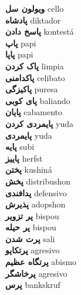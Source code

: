 \textbf{ ویولون سل  } cello \\
\textbf{ پادشاه  } diktador \\
\textbf{ پاسخ دادن  } kontestá \\
\textbf{ پاپ  } papi \\
\textbf{ پاپا  } papi \\
\textbf{ پاک کردن  } limpia \\
\textbf{ پاکدامنی  } celibato \\
\textbf{ پاکیزگی  } puresa \\
\textbf{ پای کوبی  } baliando \\
\textbf{ پایان  } cabamento \\
\textbf{ پایمردی کردن  } yuda \\
\textbf{ پایمردی  } yuda \\
\textbf{ پایه  } subi \\
\textbf{ پاییز  } herfst \\
\textbf{ پختن  } kushiná \\
\textbf{ پخش  } distribushon \\
\textbf{ پدافندی  } defensivo \\
\textbf{ پذیرش  } adopshon \\
\textbf{ پر تزویر  } bispou \\
\textbf{ پر حیله  } bispou \\
\textbf{ پرت شدن  } sali \\
\textbf{ پرتکاپو  } agresivo \\
\textbf{ پرتگاه عظیم  } abismo \\
\textbf{ پرخاشگر  } agresivo \\
\textbf{ پرس  } bankskruf \\
